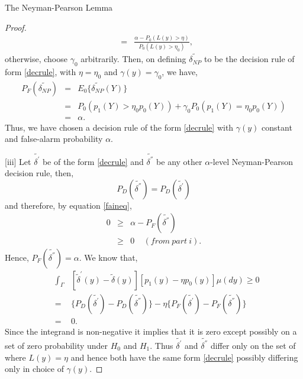 \documentclass[a4paper,english,12pt]{article}
\begin{document}
\begin{lem}{The Neyman-Pearson Lemma}
\begin{proof}{}
\begin{eqnarray}
&=& \frac{\alpha - P_0(L(y) > \eta)}{P_0(L(y) > \eta_0)},
\end{eqnarray}
otherwise, choose $\gamma_0$ arbitrarily. Then, on defining $\tilde{\delta_{NP}}$ to be the decision rule of form \ref{decrule}, with $\eta = \eta_0$ and $\gamma(y) = \gamma_0$, we have, 
\begin{eqnarray}
P_F(\tilde{\delta_{NP}}) &=& E_0\{\tilde{\delta_{NP}}(Y)\}  \nonumber \\
&=& P_0(p_1(Y) > \eta_0 p_0(Y)) + \gamma_0 P_0(p_1(Y) = \eta_0 p_0(Y)) \nonumber \\
&=& \alpha.
\end{eqnarray}
Thus, we have chosen a decision rule of the form \ref{decrule} with $\gamma(y)$ constant and false-alarm probability $\alpha$. 

[iii] Let $\tilde{\delta^{'}}$ be of the form \ref{decrule} and $\tilde{\delta^{''}}$ be any other $\alpha$-level Neyman-Pearson decision rule, then,
\begin{equation}
P_D(\tilde{\delta^{''}}) = P_D(\tilde{\delta^{'}})
\end{equation}
and therefore, by equation \ref{faineq},
\begin{eqnarray}
0 &\geq & \alpha - P_F(\tilde{\delta^{''}}) \nonumber \\
&\geq & 0 ~~~~~ (from~ part~ i). 
\end{eqnarray}
Hence, $P_F(\tilde{\delta^{''}}) = \alpha$. We know that,
\begin{eqnarray}
&\int_{\Gamma}& [\tilde{\delta}^{'} (y) - \tilde{\delta} (y) ][p_1(y) - \eta p_0(y)]  \mu (dy) \geq 0 \nonumber \\ 
&=&\{ P_D(\tilde{\delta^{'}}) - P_D(\tilde{\delta^{''}})\} - \eta \{ P_F(\tilde{\delta^{'}}) - P_F(\tilde{\delta^{''}})\} \nonumber \\
&=& 0.
\end{eqnarray}
Since the integrand is non-negative it implies that it is zero except possibly on a set of zero probability under $H_0$ and $H_1$. Thus $\tilde{\delta^{'}}$ and $\tilde{\delta^{''}}$ differ only on the set of where $L(y) = \eta$ and hence both have the same form \ref{decrule} possibly differing only in choice of $\gamma(y)$.
\end{proof}
\end{lem}
\end{document}
